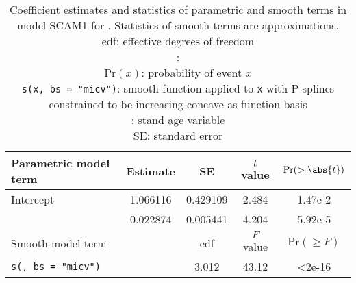 \begin{singlespace}
  \begin{table}[h]
    \caption{Coefficient estimates and statistics of parametric and smooth terms in model SCAM1 for \Spruce{}.  Statistics of smooth terms are approximations. \\
      edf: effective degrees of freedom \\
      \texttt{\ProductivityIndexVariableR{}}: \ProductivityIndexVariableText{} \\
      \(\text{Pr}(x)\): probability of event \(x\) \\
      \texttt{s(x, bs = "micv")}: smooth function applied to \texttt{x} with P-splines constrained to be increasing concave as function basis \\
      \texttt{\StandAgeVariableR{}}: stand age variable \\
      SE: standard error}
    \label{tab:StatisticsSCAM1Spruce}
    {\tabulinesep=2mm
      \begin{tabu}{L
          S[table-format = 1.6]
          S[table-format = 1.6]
          S[table-format = 2.3]
          S[table-format = 1.2e-2, table-comparator = true]
        }
        \toprule
        Parametric model term & {Estimate} & {SE} & {\(t\) value} & {\(\text{Pr}(> \abs{t})\)} \\
        \midrule
        Intercept & 1.066116 & 0.429109 & 2.484 & 1.47e-2 \\
        \texttt{\ProductivityIndexVariableR{}} & 0.022874 & 0.005441 & 4.204 & 5.92e-5
        \\
        Smooth model term &  & {edf} & {\(F\) value} & {\(\text{Pr}(\geq F)\)} \\
        \midrule
        \texttt{s(\StandAgeVariableR{}, bs = "micv")} & & 3.012 & 43.12 & <2e-16 \\
        \bottomrule
      \end{tabu}
    }
  \end{table}
\end{singlespace}

